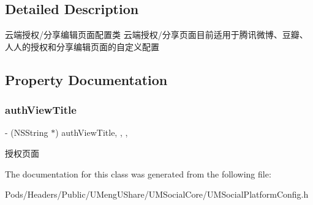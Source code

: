 \subsection{Detailed Description}
云端授权/分享编辑页面配置类 云端授权/分享页面目前适用于腾讯微博、豆瓣、人人的授权和分享编辑页面的自定义配置 

\subsection{Property Documentation}
\mbox{\label{interface_u_m_social_cloud_view_config_ab02e344e134fccd0e28e383981811e3d}} 
\subsubsection{\texorpdfstring{auth\+View\+Title}{authViewTitle}}
{\footnotesize\ttfamily -\/ (N\+S\+String $\ast$) auth\+View\+Title\hspace{0.3cm}{\ttfamily [read]}, {\ttfamily [write]}, {\ttfamily [nonatomic]}, {\ttfamily [strong]}}

授权页面 

The documentation for this class was generated from the following file\+:\begin{DoxyCompactItemize}
\item 
Pods/\+Headers/\+Public/\+U\+Meng\+U\+Share/\+U\+M\+Social\+Core/U\+M\+Social\+Platform\+Config.\+h\end{DoxyCompactItemize}
